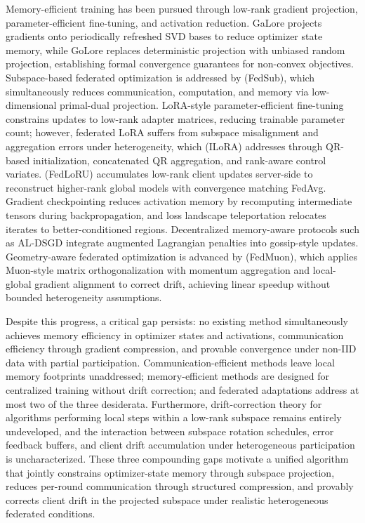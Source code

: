 \documentclass[11pt]{article}
\begin{document}
Memory-efficient training has been pursued through low-rank gradient projection, parameter-efficient fine-tuning, and activation reduction. GaLore \citep{Zhao2024GaLoreML} projects gradients onto periodically refreshed SVD bases to reduce optimizer state memory, while GoLore \citep{Zhao2024GoLoreGL} replaces deterministic projection with unbiased random projection, establishing formal convergence guarantees for non-convex objectives. Subspace-based federated optimization is addressed by \citet{zhang2025efficient} (FedSub), which simultaneously reduces communication, computation, and memory via low-dimensional primal-dual projection. LoRA-style parameter-efficient fine-tuning \citep{Hu2021LoRALA} constrains updates to low-rank adapter matrices, reducing trainable parameter count; however, federated LoRA suffers from subspace misalignment and aggregation errors under heterogeneity, which \citet{Zhou2025ILoRAFL} (ILoRA) addresses through QR-based initialization, concatenated QR aggregation, and rank-aware control variates. \citet{Park2024CommunicationEfficientFL} (FedLoRU) accumulates low-rank client updates server-side to reconstruct higher-rank global models with convergence matching FedAvg. Gradient checkpointing \citep{Chen2016TrainingDN} reduces activation memory by recomputing intermediate tensors during backpropagation, and loss landscape teleportation \citep{Zhao2023TeleportationAL} relocates iterates to better-conditioned regions. Decentralized memory-aware protocols such as AL-DSGD \citep{Cheng2021ALDSGDAL} integrate augmented Lagrangian penalties into gossip-style updates. Geometry-aware federated optimization is advanced by \citet{liu2025fedmuon} (FedMuon), which applies Muon-style matrix orthogonalization with momentum aggregation and local-global gradient alignment to correct drift, achieving linear speedup without bounded heterogeneity assumptions.

Despite this progress, a critical gap persists: no existing method simultaneously achieves memory efficiency in optimizer states and activations, communication efficiency through gradient compression, and provable convergence under non-IID data with partial participation. Communication-efficient methods \citep{Haddadpour2020FederatedLW, Condat2024LoCoDLCD, He2023LowerBA} leave local memory footprints unaddressed; memory-efficient methods \citep{Zhao2024GaLoreML, Zhao2024GoLoreGL} are designed for centralized training without drift correction; and federated adaptations \citep{Zhou2025ILoRAFL, Park2024CommunicationEfficientFL, liu2025fedmuon} address at most two of the three desiderata. Furthermore, drift-correction theory for algorithms performing local steps within a low-rank subspace remains entirely undeveloped, and the interaction between subspace rotation schedules, error feedback buffers, and client drift accumulation under heterogeneous participation \citep{li2019convergence, karimireddy2020scaffold, xiang2023towards} is uncharacterized. These three compounding gaps motivate a unified algorithm that jointly constrains optimizer-state memory through subspace projection, reduces per-round communication through structured compression, and provably corrects client drift in the projected subspace under realistic heterogeneous federated conditions.



\end{document}
